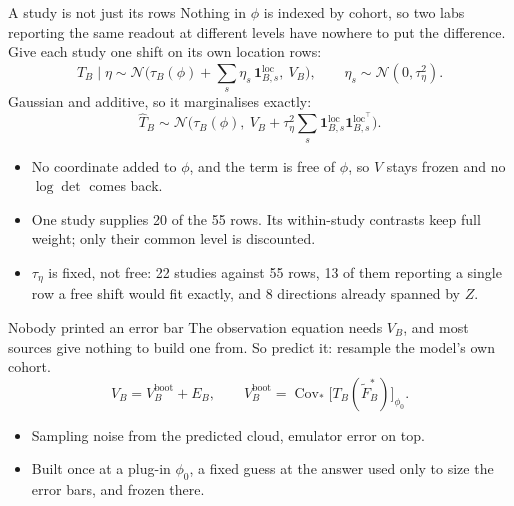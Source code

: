 \documentclass[10pt,aspectratio=169]{beamer}
\newcommand{\Ncal}{\mathcal{N}}
\newcommand{\Tr}{^{\!\top}}
\DeclareMathOperator*{\Cov}{Cov}
\begin{document}
\begin{frame}[t]{A study is not just its rows}
  Nothing in $\phi$ is indexed by cohort, so two labs reporting the same readout
  at different levels have nowhere to put the difference. Give each study one
  shift on its own location rows:
  \begingroup\small
  \[ \widehat T_B \mid \eta \sim \Ncal\Big(\tau_B(\phi)
       + \textstyle\sum_s \eta_s\,\mathbf{1}^{\mathrm{loc}}_{B,s},\ V_B\Big),
     \qquad \eta_s \sim \Ncal(0,\tau_\eta^2). \]
  Gaussian and additive, so it marginalises exactly:
  \[ \widehat T_B \sim \Ncal\Big(\tau_B(\phi),\ V_B + \tau_\eta^2
       \textstyle\sum_s \mathbf{1}^{\mathrm{loc}}_{B,s}
       \mathbf{1}^{\mathrm{loc}\Tr}_{B,s}\Big). \]
  \endgroup
  \begin{itemize}\small\setlength\itemsep{4pt}
    \item No coordinate added to $\phi$, and the term is free of $\phi$, so $V$
      stays frozen and no $\log\det$ comes back.
    \item \alert{One study supplies 20 of the 55 rows.} Its within-study
      contrasts keep full weight; only their common level is discounted.
    \item $\tau_\eta$ is fixed, not free: 22 studies against 55 rows, 13 of them
      reporting a single row a free shift would fit exactly, and 8 directions
      already spanned by $Z$.
  \end{itemize}
\end{frame}

\begin{frame}[t]{Nobody printed an error bar}
  The observation equation needs $V_B$, and most sources give nothing to build
  one from. So predict it: resample the model's own cohort.
  \[
    V_B = V^{\text{boot}}_B + E_B,
    \qquad
    V^{\text{boot}}_B = \Cov_{\ast}\!\big[T_B(\tilde F^{\ast}_B)\big]_{\phi_0} .
  \]
  \begin{itemize}
    \item Sampling noise from the predicted cloud, emulator error on top.
    \item Built once at a plug-in $\phi_0$, a fixed guess at the answer used only
      to size the error bars, and frozen there.
  \end{itemize}
\end{frame}
\end{document}
